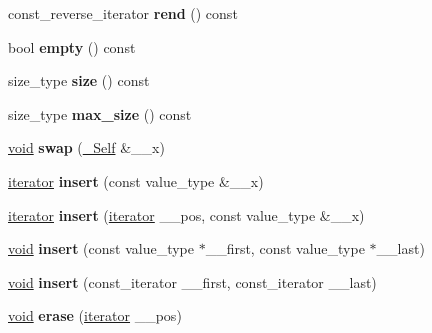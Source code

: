 \begin{DoxyCompactItemize}
const\+\_\+reverse\+\_\+iterator {\bfseries rend} () const
\item 
\mbox{\label{classmultiset_a69cd4472aa28dc71c17d770b0751a2f0}} 
bool {\bfseries empty} () const
\item 
\mbox{\label{classmultiset_a37e028347c03d8a34a63eefc968933fb}} 
size\+\_\+type {\bfseries size} () const
\item 
\mbox{\label{classmultiset_a1c689efb56fdb7510dc2029758e172b3}} 
size\+\_\+type {\bfseries max\+\_\+size} () const
\item 
\mbox{\label{classmultiset_a6b589e66a0db89044deb5309892887fa}} 
\hyperlink{interfacevoid}{void} {\bfseries swap} (\hyperlink{classmultiset}{\+\_\+\+Self} \&\+\_\+\+\_\+x)
\item 
\mbox{\label{classmultiset_a895bba2e82e7b5c23fcf8139f605d7d1}} 
\hyperlink{structiterator}{iterator} {\bfseries insert} (const value\+\_\+type \&\+\_\+\+\_\+x)
\item 
\mbox{\label{classmultiset_a3d6f58d000ab2fa8310dd3fc6f7cd95f}} 
\hyperlink{structiterator}{iterator} {\bfseries insert} (\hyperlink{structiterator}{iterator} \+\_\+\+\_\+pos, const value\+\_\+type \&\+\_\+\+\_\+x)
\item 
\mbox{\label{classmultiset_aae6b99f3e96d1c8d4ac65fce6f127220}} 
\hyperlink{interfacevoid}{void} {\bfseries insert} (const value\+\_\+type $\ast$\+\_\+\+\_\+first, const value\+\_\+type $\ast$\+\_\+\+\_\+last)
\item 
\mbox{\label{classmultiset_a1b8b770a8cf95a976a9868af84f72b60}} 
\hyperlink{interfacevoid}{void} {\bfseries insert} (const\+\_\+iterator \+\_\+\+\_\+first, const\+\_\+iterator \+\_\+\+\_\+last)
\item 
\mbox{\label{classmultiset_a7dfc7ee3d44b830efb8d3f9212b1d35b}} 
\hyperlink{interfacevoid}{void} {\bfseries erase} (\hyperlink{structiterator}{iterator} \+\_\+\+\_\+pos)
\item 
\mbox{\label{classmultiset_afbbb87ac132b86f16d44cc814d7a7ba0}} 

\end{DoxyCompactItemize}
